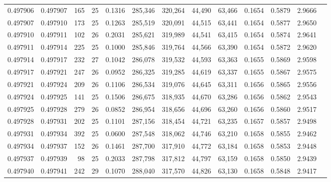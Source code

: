\begin{tabular}{rrrrrrrrrrrrr}
0.497906 & 0.497907 & 165 &  25 &                                     0.1316 & 285,346 & 320,264 &  44,490 &  63,466 & 0.1654 & 0.5879 & 2.9666 \\
0.497907 & 0.497910 & 173 &  25 &                                     0.1263 & 285,519 & 320,091 &  44,515 &  63,441 & 0.1654 & 0.5877 & 2.9650 \\
0.497910 & 0.497911 & 102 &  26 &                                     0.2031 & 285,621 & 319,989 &  44,541 &  63,415 & 0.1654 & 0.5874 & 2.9641 \\
0.497911 & 0.497914 & 225 &  25 &                                     0.1000 & 285,846 & 319,764 &  44,566 &  63,390 & 0.1654 & 0.5872 & 2.9620 \\
0.497914 & 0.497917 & 232 &  27 &                                     0.1042 & 286,078 & 319,532 &  44,593 &  63,363 & 0.1655 & 0.5869 & 2.9598 \\
0.497917 & 0.497921 & 247 &  26 &                                     0.0952 & 286,325 & 319,285 &  44,619 &  63,337 & 0.1655 & 0.5867 & 2.9575 \\
0.497921 & 0.497924 & 209 &  26 &                                     0.1106 & 286,534 & 319,076 &  44,645 &  63,311 & 0.1656 & 0.5865 & 2.9556 \\
0.497924 & 0.497925 & 141 &  25 &                                     0.1506 & 286,675 & 318,935 &  44,670 &  63,286 & 0.1656 & 0.5862 & 2.9543 \\
0.497925 & 0.497928 & 279 &  26 &                                     0.0852 & 286,954 & 318,656 &  44,696 &  63,260 & 0.1656 & 0.5860 & 2.9517 \\
0.497928 & 0.497931 & 202 &  25 &                                     0.1101 & 287,156 & 318,454 &  44,721 &  63,235 & 0.1657 & 0.5857 & 2.9498 \\
0.497931 & 0.497934 & 392 &  25 &                                     0.0600 & 287,548 & 318,062 &  44,746 &  63,210 & 0.1658 & 0.5855 & 2.9462 \\
0.497934 & 0.497937 & 152 &  26 &                                     0.1461 & 287,700 & 317,910 &  44,772 &  63,184 & 0.1658 & 0.5853 & 2.9448 \\
0.497937 & 0.497939 &  98 &  25 &                                     0.2033 & 287,798 & 317,812 &  44,797 &  63,159 & 0.1658 & 0.5850 & 2.9439 \\
0.497940 & 0.497941 & 242 &  29 &                                     0.1070 & 288,040 & 317,570 &  44,826 &  63,130 & 0.1658 & 0.5848 & 2.9417 \\

\end{tabular}
